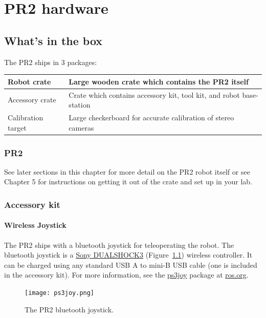 \chapter{PR2 hardware}

\section{What's in the box}
The PR2 ships in 3 packages:

\begin{tabularx}{\linewidth}{| l | X |}
\hline      
  Robot crate & Large wooden crate which contains the PR2 itself \\ \hline
  Accessory crate & Crate which contains accessory kit, tool kit, and robot base-station \\ \hline
  Calibration target & Large checkerboard for accurate calibration of stereo cameras \\ \hline
\end{tabularx}

\subsection{PR2}
See later sections in this chapter for more detail on the PR2 robot itself or see Chapter 5 for instructions on getting it out of the crate and set up in your lab.
\subsection{Accessory kit}
\subsubsection{Wireless Joystick}
The PR2 ships with a bluetooth joystick for teleoperating the robot. The
bluetooth joystick is a
\href{http://www.sonystyle.com/webapp/wcs/stores/servlet/ProductDisplay?catalogId=10551&storeId=10151&langId=-1&productId=8198552921665411965#additionalImage1%22}{Sony
  DUALSHOCK3} (Figure~\ref{fig:ps3joy}) wireless controller. It can be charged
using any standard USB A to mini-B USB cable (one is included in the accessory kit). For more information, see the
\href{http://www.ros.org/wiki/ps3joy}{ps3joy} package at
\href{http://www.ros.org}{ros.org}.

\begin{figure}[h!]
\centering
\texttt{[image: ps3joy.png]}
\caption{The PR2 bluetooth joystick.}
\label{fig:ps3joy}
\end{figure}

